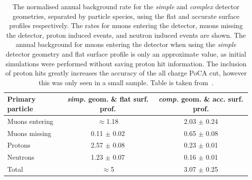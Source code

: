 \begin{table}
  \caption[The normalised annual background rate for the \emph{simple} detector geometry and flat surface profile, and for the \emph{complex} geometry and accurate surface profile]
          {The normalised annual background rate for the \emph{simple} and \emph{complex} detector geometries, separated by particle species, using the flat and accurate surface profiles respectively. The rates for muons entering the detector, muons missing the detector, proton induced events, and neutron induced events are shown. The annual background for muons entering the detector when using the \emph{simple} detector geometry and flat surface profile is only an approximate value, as initial simulations were performed without saving proton hit information. The inclusion of proton hits greatly increases the accuracy of the all charge PoCA cut, however this was only seen in a small sample. Table is taken from~\citep{MartinsThesis}.}
  \centering
  \label{tab:FinalSurfRates}
  \begin{tabular}{l c c}
    \toprule
        {Primary particle} & {\emph{simp.} geom. \& flat surf. prof.} & {\emph{comp.} geom. \& acc. surf. prof.} \\ 
        \midrule
        Muons entering     & $\approx$1.18     & 2.03 $\pm$ 0.24 \\

        Muons missing      & 0.11 $\pm$ 0.02   & 0.65 $\pm$ 0.08 \\

        Protons            & 2.57 $\pm$ 0.08   & 0.23 $\pm$ 0.01 \\

        Neutrons           & 1.23 $\pm$ 0.07   & 0.16 $\pm$ 0.01 \\

        Total              & $\approx$5        & 3.07 $\pm$ 0.25 \\
    \bottomrule
  \end{tabular}
\end{table}

